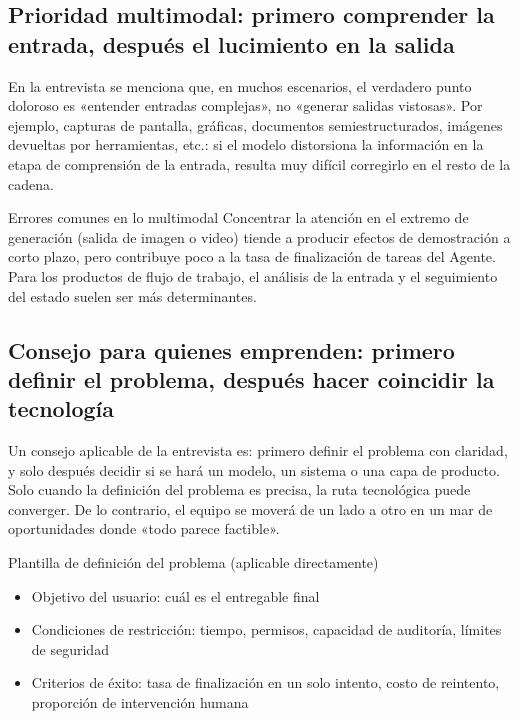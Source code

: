 \documentclass[a4paper]{article}
\begin{document}
\subsection{Prioridad multimodal: primero comprender la entrada, después el lucimiento en la salida}

En la entrevista se menciona que, en muchos escenarios, el verdadero punto doloroso es «entender entradas complejas», no «generar salidas vistosas». Por ejemplo, capturas de pantalla, gráficas, documentos semiestructurados, imágenes devueltas por herramientas, etc.: si el modelo distorsiona la información en la etapa de comprensión de la entrada, resulta muy difícil corregirlo en el resto de la cadena.

\begin{warningbox}{Errores comunes en lo multimodal}
Concentrar la atención en el extremo de generación (salida de imagen o video) tiende a producir efectos de demostración a corto plazo, pero contribuye poco a la tasa de finalización de tareas del Agente. Para los productos de flujo de trabajo, el análisis de la entrada y el seguimiento del estado suelen ser más determinantes.
\end{warningbox}

\subsection{Consejo para quienes emprenden: primero definir el problema, después hacer coincidir la tecnología}

Un consejo aplicable de la entrevista es: primero definir el problema con claridad, y solo después decidir si se hará un modelo, un sistema o una capa de producto. Solo cuando la definición del problema es precisa, la ruta tecnológica puede converger. De lo contrario, el equipo se moverá de un lado a otro en un mar de oportunidades donde «todo parece factible».

\begin{knowledgebox}{Plantilla de definición del problema (aplicable directamente)}
\begin{itemize}
    \item Objetivo del usuario: cuál es el entregable final
    \item Condiciones de restricción: tiempo, permisos, capacidad de auditoría, límites de seguridad
    \item Criterios de éxito: tasa de finalización en un solo intento, costo de reintento, proporción de intervención humana
\end{itemize}
\end{knowledgebox}
\end{document}
